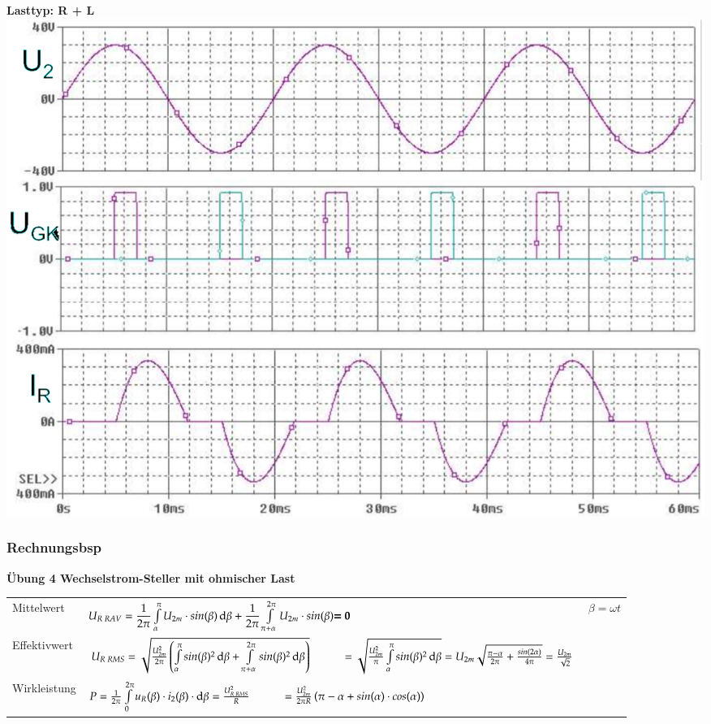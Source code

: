 \begin{minipage}{0.3\linewidth}
    \textbf{Lasttyp: R + L}\newline
    \includegraphics[width=\linewidth]{images/KLWSSteller2}
\end{minipage}


\subsubsection{Rechnungsbsp}
\textbf{Übung 4 Wechselstrom-Steller mit ohmischer Last}
\begin{longtable}{ p{}  p{}  p{} } %
    Mittelwert&
    $ {U}_{R\; RAV} = \dfrac{1}{2\pi} \int\limits_{\alpha}^{\pi}U_{2m}\cdot sin(\beta) \mathop{}\!\mathrm{d} \beta + \dfrac{1}{2\pi} \int\limits_{\pi +\alpha}^{2\pi}U_{2m}\cdot sin(\beta) \textbf{= 0} $ &
    $ \beta = \omega t $
    \\ 
    
    Effektivwert&
    $ U_{R\; RMS}= \sqrt{\frac{U_{2m}^2}{2\pi}\left( \int\limits_{\alpha}^{\pi} sin(\beta)^2 \diff \beta + \int\limits_{\pi +\alpha}^{2\pi} sin(\beta)^2 \diff \beta \right)} \newline
    \hspace*{1cm} =\sqrt{\frac{U_{2m}^2}{\pi}\int\limits_{\alpha}^{\pi} sin(\beta)^2 \diff\beta}
    = U_{2m}\sqrt{\frac{\pi - \alpha}{2 \pi}+ \frac{sin(2\alpha)}{4\pi}} = \frac{U_{2m}}{\sqrt{2}} $ &
    \\
    
    Wirkleistung&
    $ P = \frac{1}{2\pi}\int\limits_{0}^{2\pi} u_{R}(\beta)\cdot i_2(\beta)\cdot \diff \beta = \frac{U_{R\;RMS}^2}{R} \newline
     \hspace*{1cm} = \frac{U_{2m}^2}{2\pi R}\left(\pi - \alpha + sin(\alpha) \cdot cos(\alpha)\right)$& 
    \\
    
\end{longtable}

%    
\clearpage